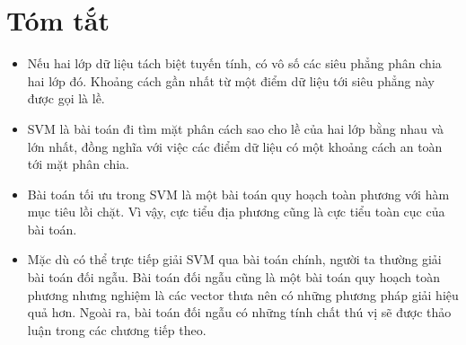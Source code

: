  
\section{Tóm tắt}
\begin{itemize}
    \item Nếu hai lớp dữ liệu tách biệt tuyến tính, có vô số các siêu phẳng phân chia hai lớp đó.
    Khoảng cách gần nhất từ một điểm dữ liệu tới siêu phẳng này được gọi là
    lề.
     
    \item SVM là bài toán đi tìm mặt phân cách sao cho 
    lề của hai lớp bằng nhau và lớn nhất, đồng nghĩa với việc các điểm dữ liệu có
    một {khoảng cách an toàn} tới mặt phân chia.
     
    \item Bài toán tối ưu trong SVM là một bài toán quy hoạch toàn phương với hàm mục
    tiêu lồi chặt. Vì vậy, cực tiểu địa phương cũng là
    cực tiểu toàn cục của bài toán.
         
    \item Mặc dù có thể trực tiếp giải SVM qua bài toán chính, người ta thường giải bài toán đối ngẫu. Bài toán
    đối ngẫu cũng là một bài toán quy hoạch toàn phương nhưng nghiệm là các vector thưa nên có những
    phương pháp giải hiệu quả hơn. Ngoài ra, bài toán đối ngẫu có những tính chất thú vị sẽ được thảo luận trong các chương tiếp theo.
\end{itemize}
 
 
 
 
 
